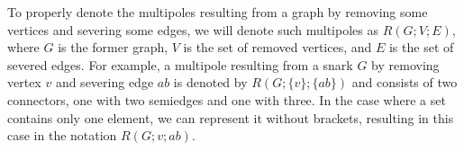 To properly denote the multipoles resulting from a graph by removing some vertices and severing some edges, we will denote such multipoles as $R(G;V;E)$, where $G$ is the former graph, $V$ is the set of removed vertices, and $E$ is the set of severed edges. For example, a multipole resulting from a snark $G$ by removing vertex $v$ and severing edge $ab$ is denoted by $R(G;\{v\}; \{ab\})$ and consists of two connectors, one with two semiedges and one with three. In the case where a set contains only one element, we can represent it without brackets, resulting in this case in the notation $R(G;v; ab)$.
